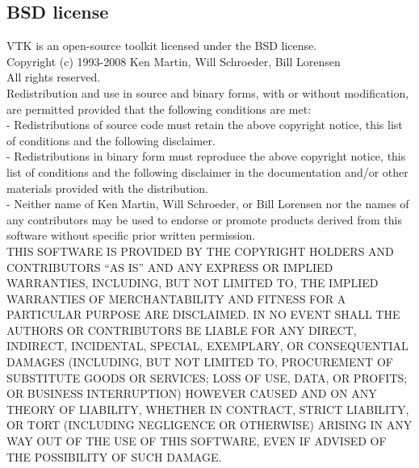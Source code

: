 \documentclass[a4paper,12pt,openany]{book}
\theoremstyle{break}
\begin{document}
\subsection{BSD license}
VTK is an open-source toolkit licensed under the BSD license.\\
Copyright (c) 1993-2008 Ken Martin, Will Schroeder, Bill Lorensen \\
All rights reserved.\\
Redistribution and use in source and binary forms, with or without modification, are permitted provided that the following conditions are met: \\
- Redistributions of source code must retain the above copyright notice, this list of conditions and the following disclaimer. \\
- Redistributions in binary form must reproduce the above copyright notice, this list of conditions and the following disclaimer in the documentation and/or other materials provided with the distribution. \\
- Neither name of Ken Martin, Will Schroeder, or Bill Lorensen nor the names of any contributors may be used to endorse or promote products derived from this software without specific prior written permission.\\

THIS SOFTWARE IS PROVIDED BY THE COPYRIGHT HOLDERS AND CONTRIBUTORS “AS IS” AND ANY EXPRESS OR IMPLIED WARRANTIES, INCLUDING, BUT NOT LIMITED TO, THE IMPLIED WARRANTIES OF MERCHANTABILITY AND FITNESS FOR A PARTICULAR PURPOSE ARE DISCLAIMED. IN NO EVENT SHALL THE AUTHORS OR CONTRIBUTORS BE LIABLE FOR ANY DIRECT, INDIRECT, INCIDENTAL, SPECIAL, EXEMPLARY, OR CONSEQUENTIAL DAMAGES (INCLUDING, BUT NOT LIMITED TO, PROCUREMENT OF SUBSTITUTE GOODS OR SERVICES; LOSS OF USE, DATA, OR PROFITS; OR BUSINESS INTERRUPTION) HOWEVER CAUSED AND ON ANY THEORY OF LIABILITY, WHETHER IN CONTRACT, STRICT LIABILITY, OR TORT (INCLUDING NEGLIGENCE OR OTHERWISE) ARISING IN ANY WAY OUT OF THE USE OF THIS SOFTWARE, EVEN IF ADVISED OF THE POSSIBILITY OF SUCH DAMAGE.
\end{document}
